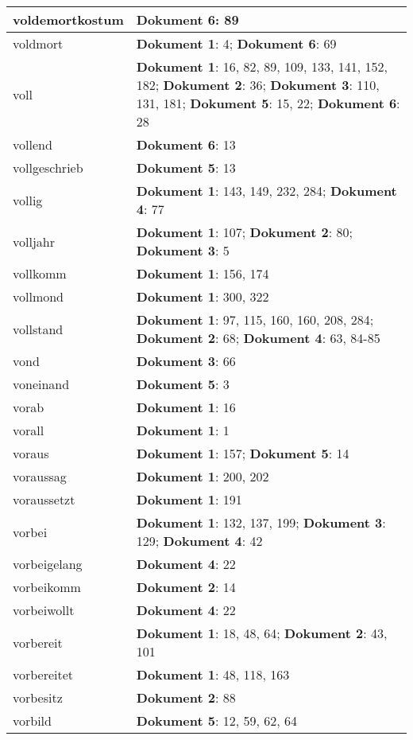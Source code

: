 \documentclass[a5paper]{article}
\begin{document}
\begin{longtable}[l]{|l|p{3in}|}
\hline
voldemortkostum & \textbf{Dokument 6}: 89 \\
\hline
voldmort & \textbf{Dokument 1}: 4; \textbf{Dokument 6}: 69 \\
\hline
voll & \textbf{Dokument 1}: 16, 82, 89, 109, 133, 141, 152, 182; \textbf{Dokument 2}: 36; \textbf{Dokument 3}: 110, 131, 181; \textbf{Dokument 5}: 15, 22; \textbf{Dokument 6}: 28 \\
\hline
vollend & \textbf{Dokument 6}: 13 \\
\hline
vollgeschrieb & \textbf{Dokument 5}: 13 \\
\hline
vollig & \textbf{Dokument 1}: 143, 149, 232, 284; \textbf{Dokument 4}: 77 \\
\hline
volljahr & \textbf{Dokument 1}: 107; \textbf{Dokument 2}: 80; \textbf{Dokument 3}: 5 \\
\hline
vollkomm & \textbf{Dokument 1}: 156, 174 \\
\hline
vollmond & \textbf{Dokument 1}: 300, 322 \\
\hline
vollstand & \textbf{Dokument 1}: 97, 115, 160, 160, 208, 284; \textbf{Dokument 2}: 68; \textbf{Dokument 4}: 63, 84-85 \\
\hline
vond & \textbf{Dokument 3}: 66 \\
\hline
voneinand & \textbf{Dokument 5}: 3 \\
\hline
vorab & \textbf{Dokument 1}: 16 \\
\hline
vorall & \textbf{Dokument 1}: 1 \\
\hline
voraus & \textbf{Dokument 1}: 157; \textbf{Dokument 5}: 14 \\
\hline
voraussag & \textbf{Dokument 1}: 200, 202 \\
\hline
voraussetzt & \textbf{Dokument 1}: 191 \\
\hline
vorbei & \textbf{Dokument 1}: 132, 137, 199; \textbf{Dokument 3}: 129; \textbf{Dokument 4}: 42 \\
\hline
vorbeigelang & \textbf{Dokument 4}: 22 \\
\hline
vorbeikomm & \textbf{Dokument 2}: 14 \\
\hline
vorbeiwollt & \textbf{Dokument 4}: 22 \\
\hline
vorbereit & \textbf{Dokument 1}: 18, 48, 64; \textbf{Dokument 2}: 43, 101 \\
\hline
vorbereitet & \textbf{Dokument 1}: 48, 118, 163 \\
\hline
vorbesitz & \textbf{Dokument 2}: 88 \\
\hline
vorbild & \textbf{Dokument 5}: 12, 59, 62, 64 \\

\end{longtable}
\end{document}
